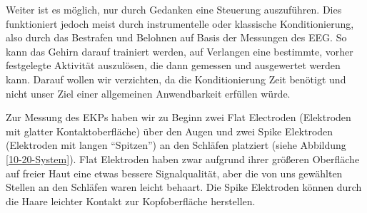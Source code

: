 \documentclass[11pt]{scrartcl}
\begin{document}
	\begin{figure}[h!]
	\end{figure}

	Weiter ist es möglich, nur durch Gedanken eine Steuerung auszuführen. Dies funktioniert jedoch meist durch instrumentelle oder klassische Konditionierung, also durch das Bestrafen und Belohnen auf Basis der Messungen des EEG. So kann das Gehirn darauf trainiert werden, auf Verlangen eine bestimmte, vorher festgelegte Aktivität auszulösen, die dann gemessen und ausgewertet werden kann. \cite{BCIChaudhary} Darauf wollen wir verzichten, da die Konditionierung Zeit benötigt und nicht unser Ziel einer allgemeinen Anwendbarkeit erfüllen würde.
	

	Zur Messung des EKPs haben wir zu Beginn zwei Flat Electroden (Elektroden mit glatter Kontaktoberfläche) über den Augen und zwei Spike Elektroden (Elektroden mit langen \enquote{Spitzen}) an den Schläfen platziert (siehe Abbildung \ref{10-20-System}). Flat Elektroden haben zwar aufgrund ihrer größeren Oberfläche auf freier Haut eine etwas bessere Signalqualität, aber die von uns gewählten Stellen an den Schläfen waren leicht behaart. Die Spike Elektroden können durch die Haare leichter Kontakt zur Kopfoberfläche herstellen.

	\begin{figure}[h!]
	\end{figure}
\end{document}
